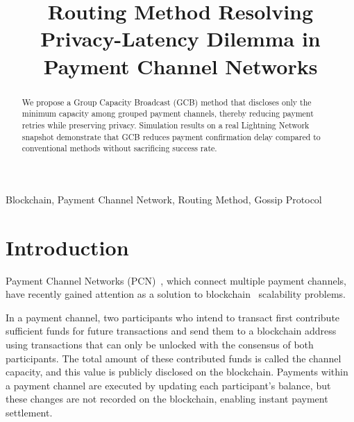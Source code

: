 \documentclass[conference]{IEEEtran}
\begin{document}
\title{Routing Method Resolving Privacy-Latency Dilemma in Payment Channel Networks}

\author{
	\and
}

\maketitle

\begin{abstract}
	We propose a Group Capacity Broadcast (GCB) method that discloses only the minimum capacity among grouped payment channels, thereby reducing payment retries while preserving privacy.
	Simulation results on a real Lightning Network snapshot demonstrate that GCB reduces payment confirmation delay compared to conventional methods without sacrificing success rate.
\end{abstract}

\begin{IEEEkeywords}
	Blockchain, Payment Channel Network, Routing Method, Gossip Protocol
\end{IEEEkeywords}

\section{Introduction}

Payment Channel Networks (PCN)~\cite{poon_dryja_2016}, which connect multiple payment channels, have recently gained attention as a solution to blockchain~\cite{nakamoto2008bitcoin} scalability problems.

In a payment channel, two participants who intend to transact first contribute sufficient funds for future transactions and send them to a blockchain address using transactions that can only be unlocked with the consensus of both participants.
The total amount of these contributed funds is called the channel capacity, and this value is publicly disclosed on the blockchain.
Payments within a payment channel are executed by updating each participant's balance, but these changes are not recorded on the blockchain, enabling instant payment settlement.
\end{document}
